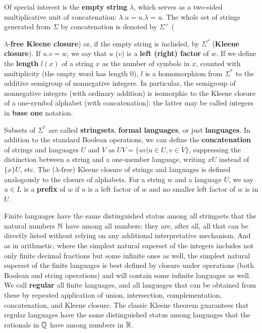 Of special interest is the {\bf empty string} $\lambda$, which serves as a
two-sided multiplicative unit of concatenation: $\lambda . u = u .  \lambda =
u$. The whole set of strings generated from $\Sigma$ by concatenation is
denoted by $\Sigma^+$ ({$\lambda$-{\bf free Kleene closure}) or, if the empty
string is included, by $\Sigma^*$ ({\bf Kleene closure}).  If $u . v = w$, we
say that $u$ ($v$) is a {\bf left (right) factor} of $w$.  If we define the
{\bf length} $l(x)$ of a string $x$ as the number of symbols in $x$, counted
with multiplicity (the empty word has length 0), $l$ is a homomorphism from
$\Sigma^*$ to the additive semigroup of nonnegative integers.  In particular,
the semigroup of nonnegative integers (with ordinary addition) is isomorphic
to the Kleene closure of a one-symbol alphabet (with concatenation): the
latter may be called integers in {\bf base one} notation.
  
 
 
 

Subsets of $\Sigma^*$ are called {\bf stringsets}, {\bf formal languages}, or
just {\bf languages}. In addition to the standard Boolean operations, we can
define the {\bf concatenation} of strings and languages $U$ and $V$ as
$UV=\{uv | u \in U, v \in V\}$, suppressing the distinction between a string
and a one-member language, writing $xU$ instead of $\{x\}U$, etc. The
($\lambda$-free) Kleene closure of strings and languages is defined
analogously to the closure of alphabets. For a string $w$ and a language $U$, 
we say $u \in L$ is a {\bf prefix} of $w$ if $u$ is a left factor of $w$ and
no smaller left factor of $w$ is in $U$. 

Finite languages have the same distinguished status among all stringsets that
the natural numbers ${\Bbb N}$ have among all numbers: they are, after all, all that
can be directly listed without relying on any additional interpretative
mechanism.  And as in arithmetic, where the simplest natural superset of the
integers includes not only finite decimal fractions but some infinite ones as
well, the simplest natural superset of the finite languages is best defined by
closure under operations (both Boolean and string operations) and will contain
some infinite languages as well. We call {\bf regular} all finite languages,
and all languages that can be obtained from these by repeated application of
union, intersection, complementation, concatenation, and Kleene closure.  The
classic Kleene theorem guarantees that regular languages have the same
distinguished status among languages that the rationals in ${\Bbb Q}$ have
among numbers in ${\Bbb R}$. 
 
 

}
